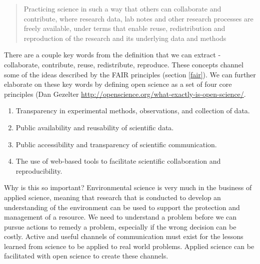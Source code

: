 \documentclass[
]{book}
\providecommand{\tightlist}{%
  \setlength{\itemsep}{0pt}\setlength{\parskip}{0pt}}
\begin{document}
\begin{quote}
Practicing science in such a way that others can collaborate and contribute, where research data, lab notes and other research processes are freely available, under terms that enable reuse, redistribution and reproduction of the research and its underlying data and methods
\end{quote}

There are a couple key words from the definition that we can extract - collaborate, contribute, reuse, redistribute, reproduce. These concepts channel some of the ideas described by the FAIR principles (section \ref{fair}). We can further elaborate on these key words by defining open science as a set of four core principles (Dan Gezelter \url{http://openscience.org/what-exactly-is-open-science/}.

\begin{enumerate}
\def\labelenumi{\arabic{enumi}.}
\tightlist
\item
  Transparency in experimental methods, observations, and collection of data.
\item
  Public availability and reusability of scientific data.
\item
  Public accessibility and transparency of scientific communication.
\item
  The use of web-based tools to facilitate scientific collaboration and reproducibility.
\end{enumerate}

Why is this so important? Environmental science is very much in the business of applied science, meaning that research that is conducted to develop an understanding of the environment can be used to support the protection and management of a resource. We need to understand a problem before we can pursue actions to remedy a problem, especially if the wrong decision can be costly. Active and useful channels of communication must exist for the lessons learned from science to be applied to real world problems. Applied science can be facilitated with open science to create these channels.
\end{document}
